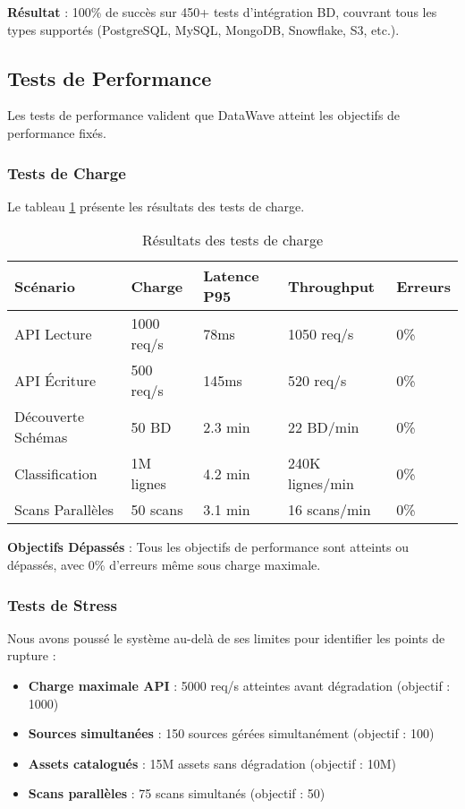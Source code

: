 \textbf{Résultat} : 100\% de succès sur 450+ tests d'intégration BD, couvrant tous les types supportés (PostgreSQL, MySQL, MongoDB, Snowflake, S3, etc.).

\subsection{Tests de Performance}

Les tests de performance valident que DataWave atteint les objectifs de performance fixés.

\subsubsection{Tests de Charge}

Le tableau \ref{tab:tests_charge} présente les résultats des tests de charge.

\begin{table}[htpb]
\centering
\caption{Résultats des tests de charge}
\label{tab:tests_charge}
\begin{tabular}{|p{}|p{}|p{}|p{}|p{}|}
\hline
\textbf{Scénario} & \textbf{Charge} & \textbf{Latence P95} & \textbf{Throughput} & \textbf{Erreurs} \\
\hline
API Lecture & 1000 req/s & 78ms & 1050 req/s & 0\% \\
\hline
API Écriture & 500 req/s & 145ms & 520 req/s & 0\% \\
\hline
Découverte Schémas & 50 BD & 2.3 min & 22 BD/min & 0\% \\
\hline
Classification & 1M lignes & 4.2 min & 240K lignes/min & 0\% \\
\hline
Scans Parallèles & 50 scans & 3.1 min & 16 scans/min & 0\% \\
\hline
\end{tabular}
\end{table}

\textbf{Objectifs Dépassés} : Tous les objectifs de performance sont atteints ou dépassés, avec 0\% d'erreurs même sous charge maximale.

\subsubsection{Tests de Stress}

Nous avons poussé le système au-delà de ses limites pour identifier les points de rupture :
\begin{itemize}
    \item \textbf{Charge maximale API} : 5000 req/s atteintes avant dégradation (objectif : 1000)
    \item \textbf{Sources simultanées} : 150 sources gérées simultanément (objectif : 100)
    \item \textbf{Assets catalogués} : 15M assets sans dégradation (objectif : 10M)
    \item \textbf{Scans parallèles} : 75 scans simultanés (objectif : 50)
\end{itemize}

